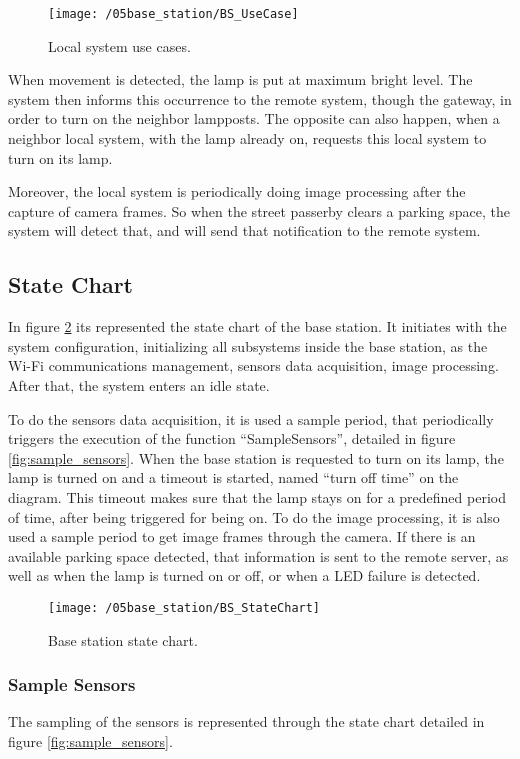\begin{figure}[ht] 
	\centering
	\texttt{[image: /05base\_station/BS\_UseCase]}
	\caption{Local system use cases.}
	\label{fig:bs_use_cases}
\end{figure}

When movement is detected, the lamp is put at maximum bright level. The system then informs this occurrence to the remote system, though the gateway, in order to turn on the neighbor lampposts. The opposite can also happen, when a neighbor local system, with the lamp already on, requests this local system to turn on its lamp. 

Moreover, the local system is periodically doing image processing after the capture of camera frames. So when the street passerby clears a parking space, the system will detect that, and will send that notification to the remote system.

\subsection{State Chart}
In figure \ref{fig:bs_state_chart} its represented the state chart of the base station. It initiates with the system configuration, initializing all subsystems inside the base station, as the Wi-Fi communications management, sensors data acquisition, image processing. After that, the system enters an idle state.

To do the sensors data acquisition, it is used a sample period, that periodically triggers the execution of the function “SampleSensors”, detailed in figure \ref{fig:sample_sensors}. When the base station is requested to turn on its lamp, the lamp is turned on and a timeout is started, named “turn off time” on the diagram. This timeout makes sure that the lamp stays on for a predefined period of time, after being triggered for being on. To do the image processing, it is also used a sample period to get image frames through the camera. If there is an available parking space detected, that information is sent to the remote server, as well as when the lamp is turned on or off, or when a LED failure is detected.

\begin{figure}[ht]
	\centering
	\texttt{[image: /05base\_station/BS\_StateChart]}
	\caption{Base station state chart.}
	\label{fig:bs_state_chart}
\end{figure}

\clearpage
\subsubsection{Sample Sensors}
The sampling of the sensors is represented through the state chart detailed in figure \ref{fig:sample_sensors}.

